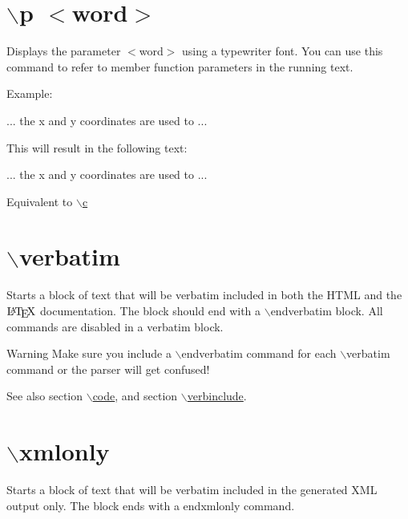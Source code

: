  \hypertarget{commands_cmdp}{}\section{$\backslash$p $<$word$>$}\label{commands_cmdp}
 Displays the parameter $<$word$>$ using a typewriter font. You can use this command to refer to member function parameters in the running text.

\begin{DoxyParagraph}{Example:}
\begin{DoxyVerb}
  ... the \p x and \p y coordinates are used to ...
  \end{DoxyVerb}
 This will result in the following text:\par
\par
 ... the {\ttfamily x} and {\ttfamily y} coordinates are used to ...
\end{DoxyParagraph}
Equivalent to \hyperlink{commands_cmdc}{$\backslash$c}



 \hypertarget{commands_cmdverbatim}{}\section{$\backslash$verbatim}\label{commands_cmdverbatim}
 Starts a block of text that will be verbatim included in both the HTML and the $\mbox{\LaTeX}$ documentation. The block should end with a $\backslash$endverbatim block. All commands are disabled in a verbatim block.

\begin{DoxyWarning}{Warning}
Make sure you include a $\backslash$endverbatim command for each $\backslash$verbatim command or the parser will get confused!
\end{DoxyWarning}
\begin{DoxySeeAlso}{See also}
section \hyperlink{commands_cmdcode}{$\backslash$code}, and section \hyperlink{commands_cmdverbinclude}{$\backslash$verbinclude}.
\end{DoxySeeAlso}


 \hypertarget{commands_cmdxmlonly}{}\section{$\backslash$xmlonly}\label{commands_cmdxmlonly}
 Starts a block of text that will be verbatim included in the generated XML output only. The block ends with a endxmlonly command.

